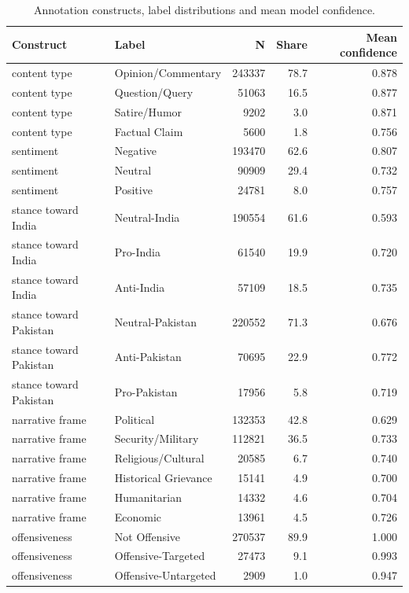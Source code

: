 \begin{table}[tbp]
\centering
\caption{Annotation constructs, label distributions and mean model confidence.}
\label{tab:layers}
\begin{tabular}{llrrr}
\toprule
Construct & Label & N & Share & Mean confidence \\
\midrule
content type & Opinion/Commentary & 243337 & 78.7 & 0.878 \\
content type & Question/Query & 51063 & 16.5 & 0.877 \\
content type & Satire/Humor & 9202 & 3.0 & 0.871 \\
content type & Factual Claim & 5600 & 1.8 & 0.756 \\
sentiment & Negative & 193470 & 62.6 & 0.807 \\
sentiment & Neutral & 90909 & 29.4 & 0.732 \\
sentiment & Positive & 24781 & 8.0 & 0.757 \\
stance toward India & Neutral-India & 190554 & 61.6 & 0.593 \\
stance toward India & Pro-India & 61540 & 19.9 & 0.720 \\
stance toward India & Anti-India & 57109 & 18.5 & 0.735 \\
stance toward Pakistan & Neutral-Pakistan & 220552 & 71.3 & 0.676 \\
stance toward Pakistan & Anti-Pakistan & 70695 & 22.9 & 0.772 \\
stance toward Pakistan & Pro-Pakistan & 17956 & 5.8 & 0.719 \\
narrative frame & Political & 132353 & 42.8 & 0.629 \\
narrative frame & Security/Military & 112821 & 36.5 & 0.733 \\
narrative frame & Religious/Cultural & 20585 & 6.7 & 0.740 \\
narrative frame & Historical Grievance & 15141 & 4.9 & 0.700 \\
narrative frame & Humanitarian & 14332 & 4.6 & 0.704 \\
narrative frame & Economic & 13961 & 4.5 & 0.726 \\
offensiveness & Not Offensive & 270537 & 89.9 & 1.000 \\
offensiveness & Offensive-Targeted & 27473 & 9.1 & 0.993  \\
offensiveness & Offensive-Untargeted & 2909 & 1.0 & 0.947 \\
\bottomrule
\end{tabular}
\vspace{2pt}
\end{table}